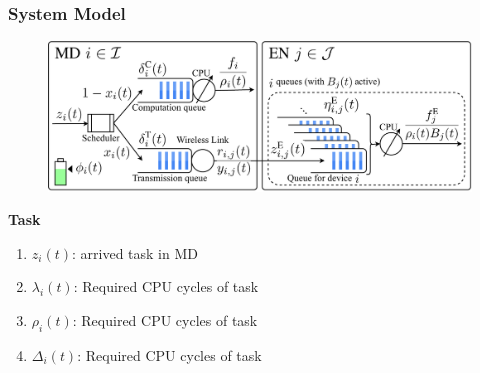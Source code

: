 \begin{frame}
	\frametitle{System Model}
	
	\begin{figure}
		\captionsetup{name=Fig.}
		\centering
		\includegraphics[width=1\linewidth]{queue}
		\vspace*{-5mm}
		\vspace*{-3mm}
		\label{fig1}
	\end{figure}

\vspace{2mm}
	\vfill
	\textbf{Task}\vspace{2mm}

	\begin{enumerate}[$\bullet$]
	
	\item $z_i(t)$:  arrived task in MD
	\item 	$\lambda_i(t)$:  Required CPU cycles of task 
	\item $\rho_i(t)$:    Required CPU cycles of task 
	\item $\Delta_i(t)$:   Required CPU cycles of task

	
	\end{enumerate}

\end{frame}


